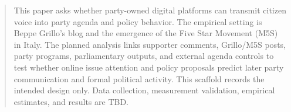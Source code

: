 \begin{abstract}
This paper asks whether party-owned digital platforms can transmit citizen voice into party agenda and policy behavior. The empirical setting is Beppe Grillo's blog and the emergence of the Five Star Movement (M5S) in Italy. The planned analysis links supporter comments, Grillo/M5S posts, party programs, parliamentary outputs, and external agenda controls to test whether online issue attention and policy proposals predict later party communication and formal political activity. This scaffold records the intended design only. Data collection, measurement validation, empirical estimates, and results are TBD.
\end{abstract}

